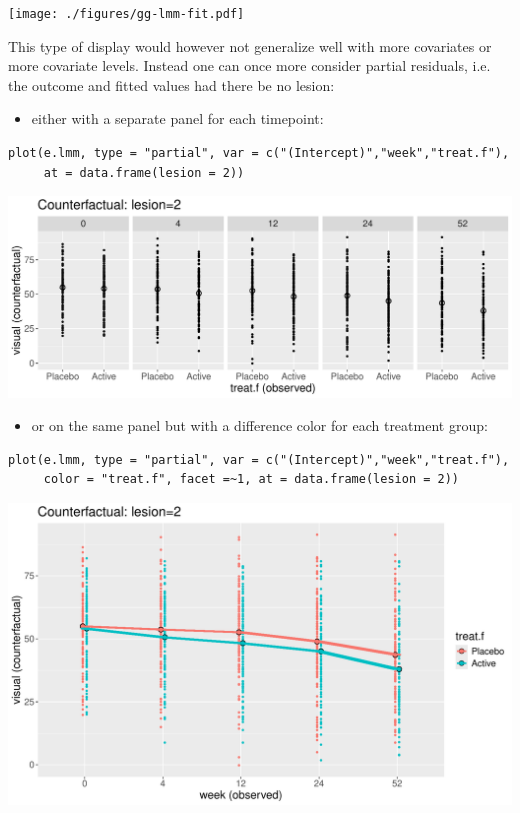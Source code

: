 \documentclass[12pt]{article}
\begin{document}
\begin{center}
\texttt{[image: ./figures/gg-lmm-fit.pdf]}
\end{center}

This type of display would however not generalize well with more
covariates or more covariate levels. Instead one can once more
consider partial residuals, i.e. the outcome and fitted values had
there be no lesion:
\begin{itemize}
\item either with a separate panel for each timepoint:
\end{itemize}
\lstset{language=r,label= ,caption= ,captionpos=b,numbers=none}
\begin{lstlisting}
plot(e.lmm, type = "partial", var = c("(Intercept)","week","treat.f"),
     at = data.frame(lesion = 2))
\end{lstlisting}

\begin{center}
\includegraphics[trim={0 0 0 0},width=1\textwidth]{./figures/gg-lmm-presFacet.pdf}
\end{center}

\begin{itemize}
\item or on the same panel but with a difference color for each treatment group:
\end{itemize}
\lstset{language=r,label= ,caption= ,captionpos=b,numbers=none}
\begin{lstlisting}
plot(e.lmm, type = "partial", var = c("(Intercept)","week","treat.f"),
     color = "treat.f", facet =~1, at = data.frame(lesion = 2))
\end{lstlisting}

\begin{center}
\includegraphics[trim={0 0 0 0},width=1\textwidth]{./figures/gg-lmm-presTraj.pdf}
\end{center}
\end{document}
